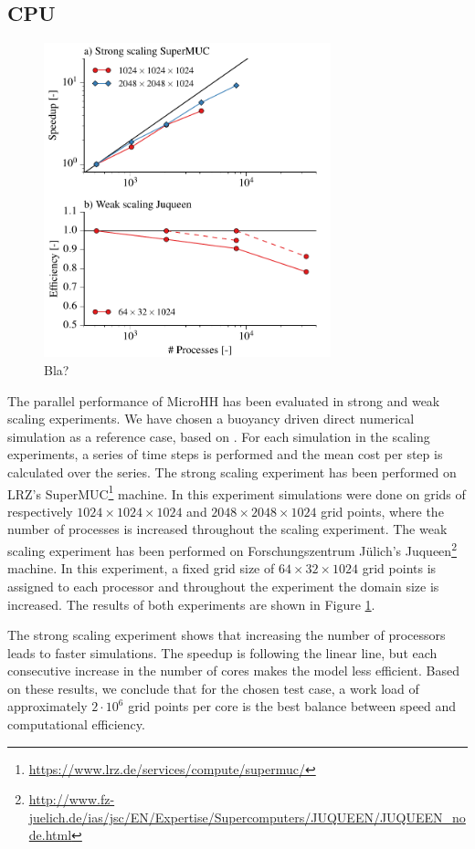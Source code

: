 \documentclass[gmd]{copernicus}
\begin{document}
\subsection{CPU}
\begin{figure}[!hbt]
	\vspace*{2mm}
	\begin{center}
		\includegraphics[width=8.3cm]{figs/scaling.pdf}
	\end{center}
	\caption{Bla?}\label{fig:scaling}
\end{figure}
The parallel performance of MicroHH has been evaluated in strong and weak scaling experiments. We have chosen a buoyancy driven direct numerical simulation as a reference case, based on \citet{vanHeerwaarden2014}. For each simulation in the scaling experiments, a series of time steps is performed and the mean cost per step is calculated over the series. The strong scaling experiment has been performed on LRZ's SuperMUC\footnote{\url{https://www.lrz.de/services/compute/supermuc/}} machine. In this experiment simulations were done on grids of respectively $1024 \times 1024 \times 1024$ and $2048 \times 2048 \times 1024$ grid points, where the number of processes is increased throughout the scaling experiment. The weak scaling experiment has been performed on Forschungszentrum J\"{u}lich's Juqueen\footnote{\url{http://www.fz-juelich.de/ias/jsc/EN/Expertise/Supercomputers/JUQUEEN/JUQUEEN_node.html}} machine. In this experiment, a fixed grid size of $64 \times 32 \times 1024$ grid points is assigned to each processor and throughout the experiment the domain size is increased. The results of both experiments are shown in Figure \ref{fig:scaling}.

The strong scaling experiment shows that increasing the number of processors leads to faster simulations. The speedup is following the linear line, but each consecutive increase in the number of cores makes the model less efficient. Based on these results, we conclude that for the chosen test case, a work load of approximately $2\cdot 10^6$ grid points per core is the best balance between speed and computational efficiency.
\end{document}

